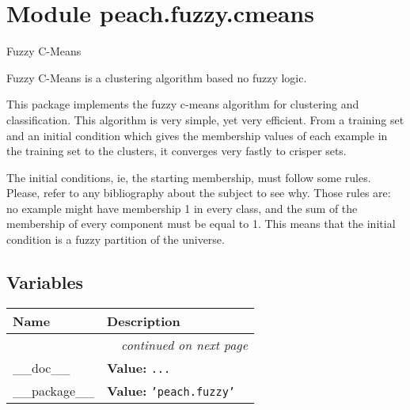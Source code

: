 %
%
%


\section{Module peach.fuzzy.cmeans}

    \label{peach:fuzzy:cmeans}

Fuzzy C-Means

Fuzzy C-Means is a clustering algorithm based no fuzzy logic.

This package implements the fuzzy c-means algorithm for clustering and
classification. This algorithm is very simple, yet very efficient. From a
training set and an initial condition which gives the membership values of each
example in the training set to the clusters, it converges very fastly to crisper
sets.

The initial conditions, ie, the starting membership, must follow some rules.
Please, refer to any bibliography about the subject to see why. Those rules are:
no example might have membership 1 in every class, and the sum of the membership
of every component must be equal to 1. This means that the initial condition is
a fuzzy partition of the universe.


  \subsection{Variables}

    \vspace{-1cm}
\hspace{\varindent}\begin{longtable}{|p{\varnamewidth}|p{\vardescrwidth}|l}
\cline{1-2}
\cline{1-2} \centering \textbf{Name} & \centering \textbf{Description}& \\
\cline{1-2}
\endhead\cline{1-2}\multicolumn{3}{r}{\small\textit{continued on next page}}\\\endfoot\cline{1-2}
\endlastfoot\raggedright \_\-\_\-d\-o\-c\-\_\-\_\- & \raggedright \textbf{Value:} 
{\tt \texttt{...}}&\\
\cline{1-2}
\raggedright \_\-\_\-p\-a\-c\-k\-a\-g\-e\-\_\-\_\- & \raggedright \textbf{Value:} 
{\tt \texttt{'}\texttt{peach.fuzzy}\texttt{'}}&\\
\cline{1-2}
\end{longtable}


